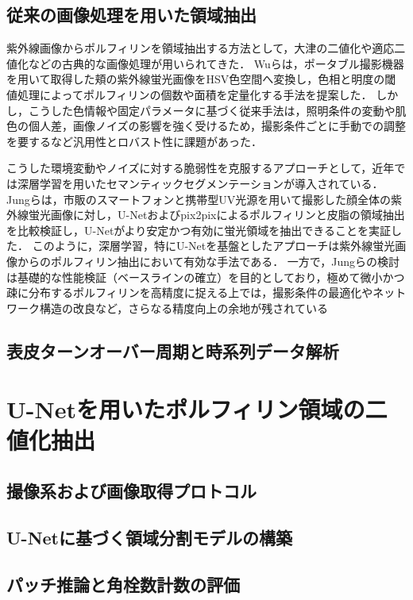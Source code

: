 \documentclass[book,paper=a4,fontsize=16pt,openany]{jlreq}
\begin{document}
\newpage
\section{従来の画像処理を用いた領域抽出}
紫外線画像からポルフィリンを領域抽出する方法として，大津の二値化や適応二値化などの古典的な画像処理が用いられてきた．
Wuらは，ポータブル撮影機器を用いて取得した頬の紫外線蛍光画像をHSV色空間へ変換し，色相と明度の閾値処理によってポルフィリンの個数や面積を定量化する手法を提案した．
しかし，こうした色情報や固定パラメータに基づく従来手法は，照明条件の変動や肌色の個人差，画像ノイズの影響を強く受けるため，撮影条件ごとに手動での調整を要するなど汎用性とロバスト性に課題があった．

こうした環境変動やノイズに対する脆弱性を克服するアプローチとして，近年では深層学習を用いたセマンティックセグメンテーションが導入されている．
Jungらは，市販のスマートフォンと携帯型UV光源を用いて撮影した顔全体の紫外線蛍光画像に対し，U-Netおよびpix2pixによるポルフィリンと皮脂の領域抽出を比較検証し，U-Netがより安定かつ有効に蛍光領域を抽出できることを実証した．
このように，深層学習，特にU-Netを基盤としたアプローチは紫外線蛍光画像からのポルフィリン抽出において有効な手法である．
一方で，Jungらの検討は基礎的な性能検証（ベースラインの確立）を目的としており，極めて微小かつ疎に分布するポルフィリンを高精度に捉える上では，撮影条件の最適化やネットワーク構造の改良など，さらなる精度向上の余地が残されている

\newpage
\section{表皮ターンオーバー周期と時系列データ解析}

\chapter{U-Netを用いたポルフィリン領域の二値化抽出}
\section{撮像系および画像取得プロトコル}
\section{U-Netに基づく領域分割モデルの構築}
\section{パッチ推論と角栓数計数の評価}
\end{document}
